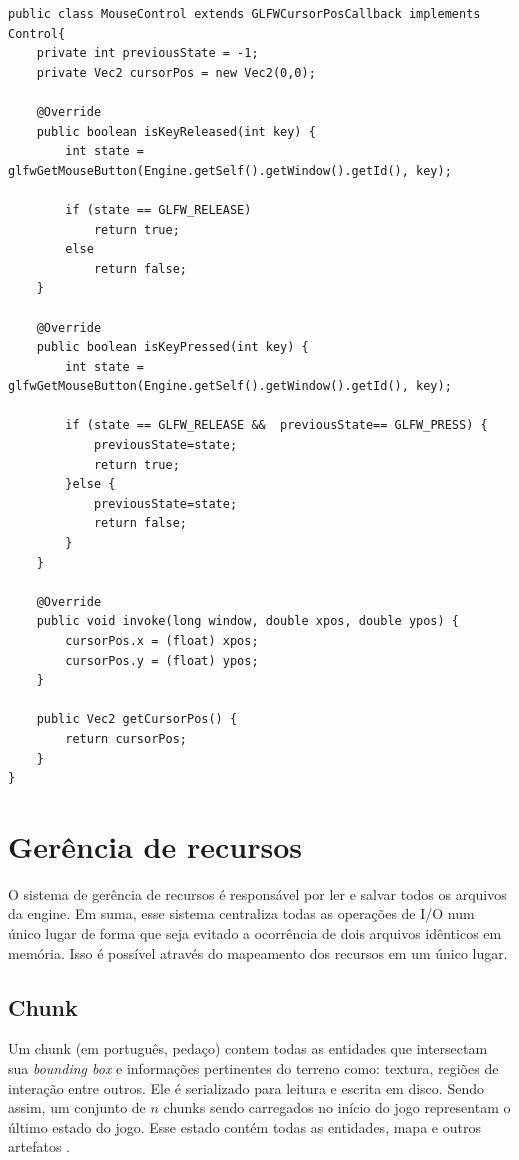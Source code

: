 \documentclass[12pt, 
openright, 
oneside, 
a4paper,    
brazil]{facom-ufu-abntex2}
\begin{document}
\begin{lstlisting}[caption=Mouse input]
public class MouseControl extends GLFWCursorPosCallback implements Control{
    private int previousState = -1;
    private Vec2 cursorPos = new Vec2(0,0);
     
    @Override
    public boolean isKeyReleased(int key) {
        int state = glfwGetMouseButton(Engine.getSelf().getWindow().getId(), key);
         
        if (state == GLFW_RELEASE) 
            return true;
        else
            return false;
    }
 
    @Override
    public boolean isKeyPressed(int key) {
        int state = glfwGetMouseButton(Engine.getSelf().getWindow().getId(), key);
         
        if (state == GLFW_RELEASE &&  previousState== GLFW_PRESS) {
            previousState=state;
            return true;
        }else {
            previousState=state;
            return false;
        }
    }
 
    @Override
    public void invoke(long window, double xpos, double ypos) {
        cursorPos.x = (float) xpos;
        cursorPos.y = (float) ypos;
    }
 
    public Vec2 getCursorPos() {
        return cursorPos;
    }
}
\end{lstlisting}


\section{Gerência de recursos}
O sistema de gerência de recursos é responsável por ler e salvar todos os arquivos da engine. Em suma, esse sistema centraliza todas as operações de I/O num único lugar de forma que seja evitado a ocorrência de dois arquivos idênticos em memória. Isso é possível através do mapeamento dos recursos em um único lugar.


\subsection{Chunk}
Um chunk (em português, pedaço) contem todas as entidades que intersectam sua \textit{bounding box} e informações pertinentes do terreno como: textura, regiões de interação entre outros. Ele é serializado para leitura e escrita em disco. Sendo assim, um conjunto de $n$ chunks sendo carregados no início do jogo representam o último estado do jogo. Esse estado contém todas as entidades, mapa e outros artefatos  .
\end{document}
